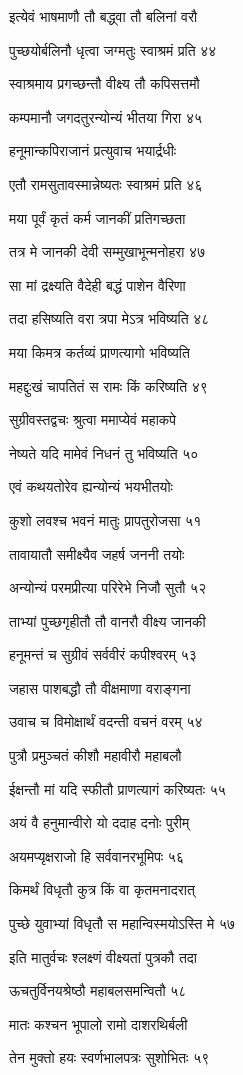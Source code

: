 इत्येवं भाषमाणौ तौ बद्ध्वा तौ बलिनां वरौ

पुच्छयोर्बलिनौ धृत्वा जग्मतुः स्वाश्रमं प्रति ४४

स्वाश्रमाय प्रगच्छन्तौ वीक्ष्य तौ कपिसत्तमौ

कम्पमानौ जगदतुरन्योन्यं भीतया गिरा ४५

हनूमान्कपिराजानं प्रत्युवाच भयार्द्रधीः

एतौ रामसुतावस्मान्नेष्यतः स्वाश्रमं प्रति ४६

मया पूर्वं कृतं कर्म जानकीं प्रतिगच्छता

तत्र मे जानकी देवी सम्मुखाभून्मनोहरा ४७

सा मां द्रक्ष्यति वैदेही बद्धं पाशेन वैरिणा

तदा हसिष्यति वरा त्रपा मेऽत्र भविष्यति ४८

मया किमत्र कर्तव्यं प्राणत्यागो भविष्यति

महद्दुःखं चापतितं स रामः किं करिष्यति ४९

सुग्रीवस्तद्वचः श्रुत्वा ममाप्येवं महाकपे

नेष्यते यदि मामेवं निधनं तु भविष्यति ५०

एवं कथयतोरेव ह्यन्योन्यं भयभीतयोः

कुशो लवश्च भवनं मातुः प्रापतुरोजसा ५१

तावायातौ समीक्ष्यैव जहर्ष जननी तयोः

अन्योन्यं परमप्रीत्या परिरेभे निजौ सुतौ ५२

ताभ्यां पुच्छगृहीतौ तौ वानरौ वीक्ष्य जानकी

हनूमन्तं च सुग्रीवं सर्ववीरं कपीश्वरम् ५३

जहास पाशबद्धौ तौ वीक्षमाणा वराङ्गना

उवाच च विमोक्षार्थं वदन्ती वचनं वरम् ५४

पुत्रौ प्रमुञ्चतं कीशौ महावीरौ महाबलौ

ईक्षन्तौ मां यदि स्फीतौ प्राणत्यागं करिष्यतः ५५

अयं वै हनुमान्वीरो यो ददाह दनोः पुरीम्

अयमप्यृक्षराजो हि सर्ववानरभूमिपः ५६

किमर्थं विधृतौ कुत्र किं वा कृतमनादरात्

पुच्छे युवाभ्यां विधृतौ स महान्विस्मयोऽस्ति मे ५७

इति मातुर्वचः श्लक्ष्णं वीक्ष्यतां पुत्रकौ तदा

ऊचतुर्विनयश्रेष्ठौ महाबलसमन्वितौ ५८

मातः कश्चन भूपालो रामो दाशरथिर्बली

तेन मुक्तो हयः स्वर्णभालपत्रः सुशोभितः ५९

